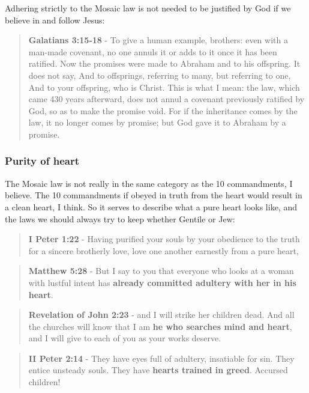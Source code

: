 \documentclass[11pt]{article}
\begin{document}
Adhering strictly to the Mosaic law is not needed to be justified by God if we believe in and follow Jesus:

\begin{quote}
\textbf{Galatians 3:15-18} - To give a human example, brothers: even with a man-made covenant, no one annuls it or adds to it once it has been ratified. Now the promises were made to Abraham and to his offspring. It does not say, And to offsprings, referring to many, but referring to one, And to your offspring, who is Christ. This is what I mean: the law, which came 430 years afterward, does not annul a covenant previously ratified by God, so as to make the promise void. For if the inheritance comes by the law, it no longer comes by promise; but God gave it to Abraham by a promise.
\end{quote}

\subsubsection{Purity of heart}
\label{sec:orge8b37ea}

The Mosaic law is not really in the same category as the 10 commandments, I believe. The 10 commandments if obeyed in truth from the heart would result in a clean heart, I think. So it serves to describe what a pure heart looks like, and the laws we should always try to keep whether Gentile or Jew:

\begin{quote}
\textbf{I Peter 1:22} - Having purified your souls by your obedience to the truth for a sincere brotherly love, love one another earnestly from a pure heart,
\end{quote}

\begin{quote}
\textbf{Matthew 5:28} - But I say to you that everyone who looks at a woman with lustful intent has \textbf{already committed adultery with her in his heart}.
\end{quote}

\begin{quote}
\textbf{Revelation of John 2:23} - and I will strike her children dead. And all the churches will know that I am \textbf{he who searches mind and heart}, and I will give to each of you as your works deserve.
\end{quote}


\begin{quote}
\textbf{II Peter 2:14} - They have eyes full of adultery, insatiable for sin. They entice unsteady souls. They have \textbf{hearts trained in greed}. Accursed children!
\end{quote}
\end{document}
